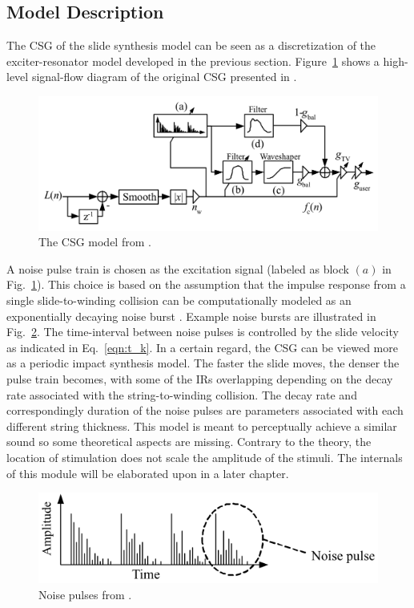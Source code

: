 \documentclass[main.tex]{subfiles}
\begin{document}
\subsection{Model Description}
The CSG of the slide synthesis model can be seen as a discretization of the exciter-resonator model developed in the previous section. Figure~\ref{fig:original_CSG} shows a high-level signal-flow diagram of the original CSG presented in . 
\begin{figure}[h]
    \centering
    \includegraphics[scale=.50]{./images/pictures/CSG_original.PNG}
    \caption{The CSG model from .}
    \label{fig:original_CSG}
\end{figure}
A noise pulse train is chosen as the excitation signal (labeled as block $(a)$ in Fig.~\ref{fig:original_CSG}). This choice is based on the assumption that the impulse response from a single slide-to-winding collision can be computationally modeled as an exponentially decaying noise burst . Example noise bursts are illustrated in Fig.~\ref{fig:noise_pulses_ch2}. The time-interval between noise pulses is controlled by the slide velocity as indicated in Eq.~\ref{eqn:t_k}. In a certain regard, the CSG can be viewed more as a periodic impact synthesis model. The faster the slide moves, the denser the pulse train becomes, with some of the IRs overlapping depending on the decay rate associated with the string-to-winding collision. The decay rate and correspondingly duration of the noise pulses are parameters associated with each different string thickness. This model is meant to perceptually achieve a similar sound so some theoretical aspects are missing. Contrary to the theory, the location of stimulation does not scale the amplitude of the stimuli. The internals of this module will be elaborated upon in a later chapter.

\begin{figure}[h]
    \centering
    \includegraphics[scale=1]{./images/pictures/noise_pulses.png}
    \caption{Noise pulses from .}
    \label{fig:noise_pulses_ch2}
\end{figure}
\end{document}
